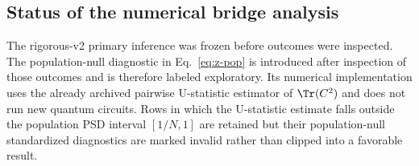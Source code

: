 \subsection{Status of the numerical bridge analysis}

The rigorous-v2 primary inference was frozen before outcomes were inspected.  The population-null diagnostic in Eq.~\eqref{eq:z-pop} is introduced after inspection of those outcomes and is therefore labeled exploratory.  Its numerical implementation uses the already archived pairwise U-statistic estimator of $\Tr(C^2)$ and does not run new quantum circuits.  Rows in which the U-statistic estimate falls outside the population PSD interval $[1/N,1]$ are retained but their population-null standardized diagnostics are marked invalid rather than clipped into a favorable result.
